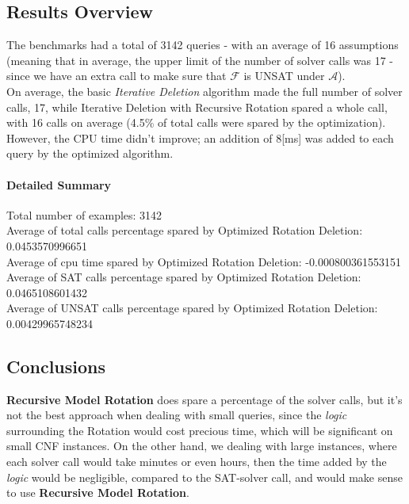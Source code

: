 \documentclass[]{article}
\begin{document}
	\subsection{Results Overview}
	The benchmarks had a total of 3142 queries - with an average of 16 assumptions (meaning that in average, the upper limit of the number of solver calls was 17 - since we have an extra call to make sure that $ \mathcal{F} $ is UNSAT under $ \mathcal{A} $).\\
	On average, the basic \textit{Iterative Deletion} algorithm made the full number of solver calls, 17, while Iterative Deletion with Recursive Rotation spared a whole call, with 16 calls on average (4.5\% of total calls were spared by the optimization). However, the CPU time didn't improve; an addition of 8[ms] was added to each query by the optimized algorithm.
	\paragraph{Detailed Summary}
	Total number of examples:  3142\\
	Average of total calls percentage spared by Optimized Rotation Deletion:  0.0453570996651\\
	Average of cpu time spared by Optimized Rotation Deletion:  -0.000800361553151\\
	Average of SAT calls percentage spared by Optimized Rotation Deletion:  0.0465108601432\\
	Average of UNSAT calls percentage spared by Optimized Rotation Deletion:  0.00429965748234\\
	
	\subsection{Conclusions}
	\textbf{Recursive Model Rotation} does spare a percentage of the solver calls, but it's not the best approach when dealing with small queries, since the \textit{logic} surrounding the Rotation would cost precious time, which will be significant on small CNF instances. On the other hand, we dealing with large instances, where each solver call would take minutes or even hours, then the time added by the \textit{logic} would be negligible, compared to the SAT-solver call, and would make sense to use \textbf{Recursive Model Rotation}.
	
\end{document}
